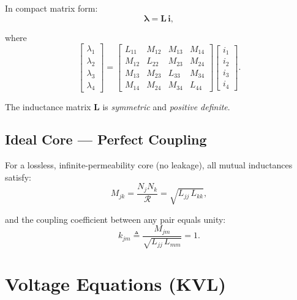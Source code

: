 \documentclass[11pt,a4paper]{article}
\newcommand{\mat}[1]{\mathbf{#1}}
\newcommand{\Rel}{\mathcal{R}}          %
\begin{document}
In compact matrix form:
\begin{equation}
  \bm{\lambda} = \mat{L}\,\mathbf{i},
  \label{eq:flux_matrix}
\end{equation}

where
\begin{equation}
  \begin{bmatrix}
    \lambda_1 \\ \lambda_2 \\ \lambda_3 \\ \lambda_4
  \end{bmatrix}
  =
  \begin{bmatrix}
    L_{11} & M_{12} & M_{13} & M_{14} \\
    M_{12} & L_{22} & M_{23} & M_{24} \\
    M_{13} & M_{23} & L_{33} & M_{34} \\
    M_{14} & M_{24} & M_{34} & L_{44}
  \end{bmatrix}
  \begin{bmatrix}
    i_1 \\ i_2 \\ i_3 \\ i_4
  \end{bmatrix}.
  \label{eq:flux_full}
\end{equation}

The inductance matrix $\mat{L}$ is \emph{symmetric} and \emph{positive definite}.

\subsection{Ideal Core — Perfect Coupling}

For a lossless, infinite-permeability core (no leakage), all mutual inductances
satisfy:
\begin{equation}
  M_{jk} = \frac{N_j N_k}{\Rel} = \sqrt{L_{jj}\,L_{kk}},
  \label{eq:mutual_ideal}
\end{equation}

and the coupling coefficient between any pair equals unity:
\begin{equation}
  k_{jm} \triangleq \frac{M_{jm}}{\sqrt{L_{jj}\,L_{mm}}} = 1.
\end{equation}

\section{Voltage Equations (KVL)}
\end{document}
